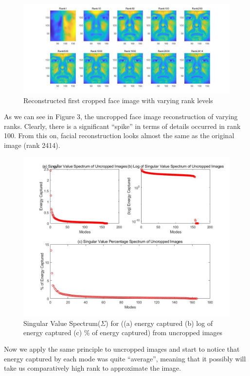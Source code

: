 \documentclass[11pt,a4paper]{article}
\numberwithin{equation}{subsection}
\begin{document}
\begin{figure}[H]
\begin{center}
\includegraphics[scale=0.42]{Ares.jpg}
\caption{Reconstructed first cropped face image with varying rank levels}
\end{center}
\end{figure}
As we can see in Figure 3, the uncropped face image reconstruction of varying ranks. Clearly, there is a significant ``spike'' in terms of details occurred in rank 100. From this on, facial reconstruction looks almost the same as the original image (rank 2414). 
\begin{figure}[H]
\begin{center}
\includegraphics[scale=0.25]{S2.jpg}
\caption{Singular Value Spectrum($\Sigma$) for ((a) energy captured (b) log of energy captured (c) \% of energy captured) from uncropped images}
\end{center}
\end{figure}
Now we apply the same principle to uncropped images and start to notice that energy captured by each mode was quite ``average'', meaning that it possibly will take us comparatively high rank to approximate the image.
\end{document}
